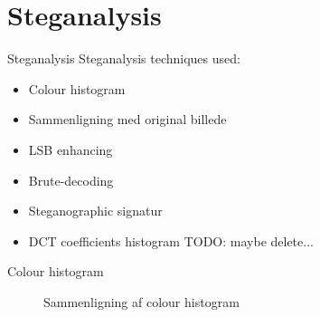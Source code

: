 \section{Steganalysis}
\begin{frame}{Steganalysis}{}
	Steganalysis techniques used:
	\begin{itemize}
		\item Colour histogram
		\item Sammenligning med original billede
		\item LSB enhancing
		\item Brute-decoding
		\item Steganographic signatur
		\item DCT coefficients histogram TODO: maybe delete...
	\end{itemize}
\end{frame}

\begin{frame}{Colour histogram}{}
\begin{figure}
\centering     %
{}
\end{figure}
\begin{figure}
\centering
{}
\caption{Sammenligning af colour histogram}
\end{figure}
\end{frame}

